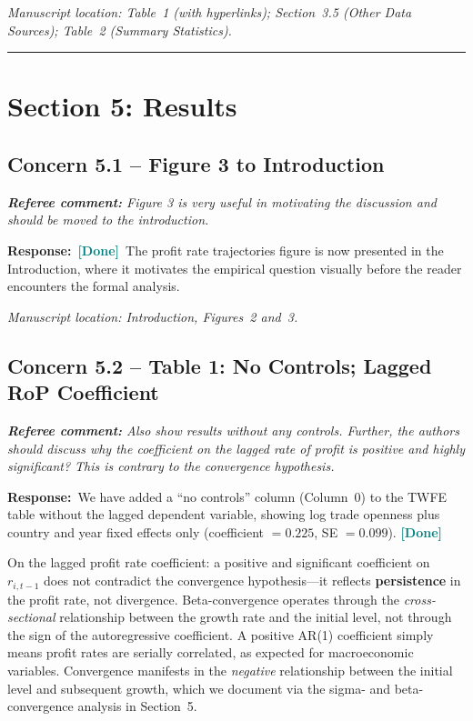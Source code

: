 \documentclass[11pt]{article}
\newcommand{\RC}[1]{\begin{refereebox}\textit{\textbf{Referee comment:} #1}\end{refereebox}}
\newcommand{\AR}{\noindent\textbf{Response:}\ }
\newcommand{\done}{\textcolor{teal}{\textbf{[Done]}}}
\begin{document}
\smallskip\noindent\textit{Manuscript location: Table~1 (with hyperlinks); Section~3.5 (Other Data Sources); Table~2 (Summary Statistics).}

\bigskip\noindent\rule{\textwidth}{0.4pt}\bigskip

\section*{Section 5: Results}

\subsection*{Concern 5.1 -- Figure 3 to Introduction}

\RC{Figure 3 is very useful in motivating the discussion and should be moved to the introduction.}

\AR \done\ The profit rate trajectories figure is now presented in the Introduction, where it motivates the empirical question visually before the reader encounters the formal analysis.

\smallskip\noindent\textit{Manuscript location: Introduction, Figures~2 and~3.}

\subsection*{Concern 5.2 -- Table 1: No Controls; Lagged RoP Coefficient}

\RC{Also show results without any controls. Further, the authors should discuss why the coefficient on the lagged rate of profit is positive and highly significant? This is contrary to the convergence hypothesis.}

\AR We have added a ``no controls'' column (Column~0) to the TWFE table without the lagged dependent variable, showing log trade openness plus country and year fixed effects only (coefficient $= 0.225$, SE $= 0.099$). \done

On the lagged profit rate coefficient: a positive and significant coefficient on $r_{i,t-1}$ does not contradict the convergence hypothesis---it reflects \textbf{persistence} in the profit rate, not divergence. Beta-convergence operates through the \emph{cross-sectional} relationship between the growth rate and the initial level, not through the sign of the autoregressive coefficient. A positive AR(1) coefficient simply means profit rates are serially correlated, as expected for macroeconomic variables. Convergence manifests in the \emph{negative} relationship between the initial level and subsequent growth, which we document via the sigma- and beta-convergence analysis in Section~5.
\end{document}
